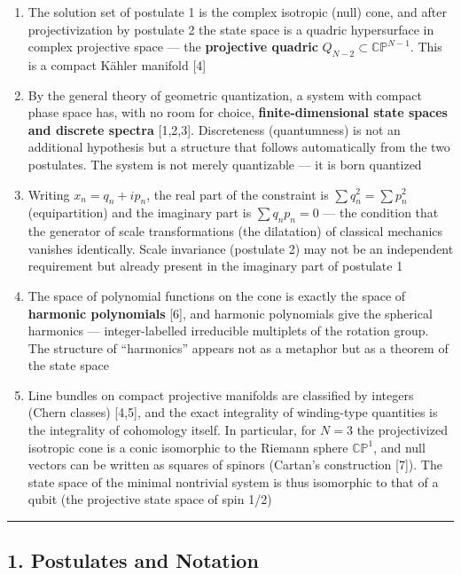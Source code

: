 \documentclass[
  a4paper,
]{article}
\providecommand{\tightlist}{%
  \setlength{\itemsep}{0pt}\setlength{\parskip}{0pt}}
\begin{document}
\begin{enumerate}
\def\labelenumi{\arabic{enumi}.}
\tightlist
\item
  The solution set of postulate 1 is the complex isotropic (null) cone,
  and after projectivization by postulate 2 the state space is a quadric
  hypersurface in complex projective space --- the \textbf{projective
  quadric} \(Q_{N-2}\subset\mathbb{CP}^{N-1}\). This is a compact Kähler
  manifold {[}4{]}
\item
  By the general theory of geometric quantization, a system with compact
  phase space has, with no room for choice, \textbf{finite-dimensional
  state spaces and discrete spectra} {[}1,2,3{]}. Discreteness
  (quantumness) is not an additional hypothesis but a structure that
  follows automatically from the two postulates. The system is not
  merely quantizable --- it is born quantized
\item
  Writing \(x_n=q_n+ip_n\), the real part of the constraint is
  \(\sum q_n^2=\sum p_n^2\) (equipartition) and the imaginary part is
  \(\sum q_np_n=0\) --- the condition that the generator of scale
  transformations (the dilatation) of classical mechanics vanishes
  identically. Scale invariance (postulate 2) may not be an independent
  requirement but already present in the imaginary part of postulate 1
\item
  The space of polynomial functions on the cone is exactly the space of
  \textbf{harmonic polynomials} {[}6{]}, and harmonic polynomials give
  the spherical harmonics --- integer-labelled irreducible multiplets of
  the rotation group. The structure of ``harmonics'' appears not as a
  metaphor but as a theorem of the state space
\item
  Line bundles on compact projective manifolds are classified by
  integers (Chern classes) {[}4,5{]}, and the exact integrality of
  winding-type quantities is the integrality of cohomology itself. In
  particular, for \(N=3\) the projectivized isotropic cone is a conic
  isomorphic to the Riemann sphere \(\mathbb{CP}^1\), and null vectors
  can be written as squares of spinors (Cartan's construction {[}7{]}).
  The state space of the minimal nontrivial system is thus isomorphic to
  that of a qubit (the projective state space of spin 1/2)
\end{enumerate}

\begin{center}\rule{0.5\linewidth}{0.5pt}\end{center}

\subsection{1. Postulates and Notation}\label{postulates-and-notation}
\end{document}
